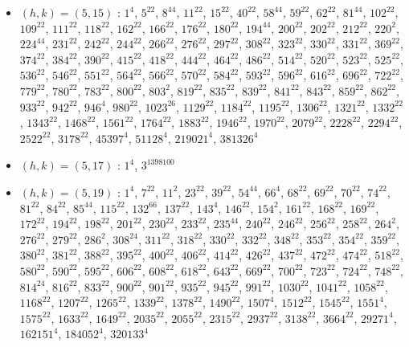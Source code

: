 \begin{itemize}
\item $(h,k)=(5,15)$ : $1^{4}$, $5^{22}$, $8^{44}$, $11^{22}$, $15^{22}$, $40^{22}$, $58^{44}$, $59^{22}$, $62^{22}$, $81^{44}$, $102^{22}$, $109^{22}$, $111^{22}$, $118^{22}$, $162^{22}$, $166^{22}$, $176^{22}$, $180^{22}$, $194^{44}$, $200^{22}$, $202^{22}$, $212^{22}$, $220^{2}$, $224^{44}$, $231^{22}$, $242^{22}$, $244^{22}$, $266^{22}$, $276^{22}$, $297^{22}$, $308^{22}$, $323^{22}$, $330^{22}$, $331^{22}$, $369^{22}$, $374^{22}$, $384^{22}$, $390^{22}$, $415^{22}$, $418^{22}$, $444^{22}$, $464^{22}$, $486^{22}$, $514^{22}$, $520^{22}$, $523^{22}$, $525^{22}$, $536^{22}$, $546^{22}$, $551^{22}$, $564^{22}$, $566^{22}$, $570^{22}$, $584^{22}$, $593^{22}$, $596^{22}$, $616^{22}$, $696^{22}$, $722^{22}$, $779^{22}$, $780^{22}$, $783^{22}$, $800^{22}$, $803^{2}$, $819^{22}$, $835^{22}$, $839^{22}$, $841^{22}$, $843^{22}$, $859^{22}$, $862^{22}$, $933^{22}$, $942^{22}$, $946^{4}$, $980^{22}$, $1023^{26}$, $1129^{22}$, $1184^{22}$, $1195^{22}$, $1306^{22}$, $1321^{22}$, $1332^{22}$, $1343^{22}$, $1468^{22}$, $1561^{22}$, $1764^{22}$, $1883^{22}$, $1946^{22}$, $1970^{22}$, $2079^{22}$, $2228^{22}$, $2294^{22}$, $2522^{22}$, $3178^{22}$, $45397^{4}$, $51128^{4}$, $219021^{4}$, $381326^{4}$
\item $(h,k)=(5,17)$ : $1^{4}$, $3^{1398100}$
\item $(h,k)=(5,19)$ : $1^{4}$, $7^{22}$, $11^{2}$, $23^{22}$, $39^{22}$, $54^{44}$, $66^{4}$, $68^{22}$, $69^{22}$, $70^{22}$, $74^{22}$, $81^{22}$, $84^{22}$, $85^{44}$, $115^{22}$, $132^{66}$, $137^{22}$, $143^{4}$, $146^{22}$, $154^{2}$, $161^{22}$, $168^{22}$, $169^{22}$, $172^{22}$, $194^{22}$, $198^{22}$, $201^{22}$, $230^{22}$, $233^{22}$, $235^{44}$, $240^{22}$, $246^{22}$, $256^{22}$, $258^{22}$, $264^{2}$, $276^{22}$, $279^{22}$, $286^{2}$, $308^{24}$, $311^{22}$, $318^{22}$, $330^{22}$, $332^{22}$, $348^{22}$, $353^{22}$, $354^{22}$, $359^{22}$, $380^{22}$, $381^{22}$, $388^{22}$, $395^{22}$, $400^{22}$, $406^{22}$, $414^{22}$, $426^{22}$, $437^{22}$, $472^{22}$, $474^{22}$, $518^{22}$, $580^{22}$, $590^{22}$, $595^{22}$, $606^{22}$, $608^{22}$, $618^{22}$, $643^{22}$, $669^{22}$, $700^{22}$, $723^{22}$, $724^{22}$, $748^{22}$, $814^{24}$, $816^{22}$, $833^{22}$, $900^{22}$, $901^{22}$, $935^{22}$, $945^{22}$, $991^{22}$, $1030^{22}$, $1041^{22}$, $1058^{22}$, $1168^{22}$, $1207^{22}$, $1265^{22}$, $1339^{22}$, $1378^{22}$, $1490^{22}$, $1507^{4}$, $1512^{22}$, $1545^{22}$, $1551^{4}$, $1575^{22}$, $1633^{22}$, $1649^{22}$, $2035^{22}$, $2055^{22}$, $2315^{22}$, $2937^{22}$, $3138^{22}$, $3664^{22}$, $29271^{4}$, $162151^{4}$, $184052^{4}$, $320133^{4}$

\end{itemize}
